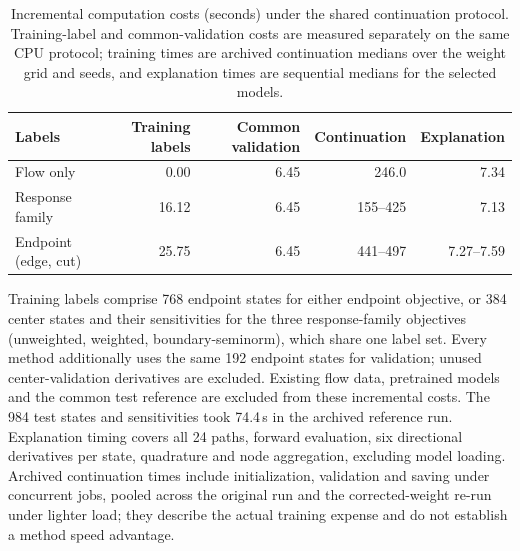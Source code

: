 \begin{table}[t]\centering\footnotesize
\caption{Incremental computation costs (seconds) under the shared
continuation protocol. Training-label and common-validation costs are
measured separately on the same CPU protocol; training times are
archived continuation medians over the weight grid and seeds, and
explanation times are sequential medians for the selected models.}
\label{tab:learning-costs}
\begin{tabular}{lrrrr}\toprule Labels & Training labels & Common validation & Continuation & Explanation\\\midrule
Flow only & 0.00 & 6.45 & 246.0 & 7.34\\
Response family & 16.12 & 6.45 & 155--425 & 7.13\\
Endpoint (edge, cut) & 25.75 & 6.45 & 441--497 & 7.27--7.59\\
\bottomrule\end{tabular}\end{table}
Training labels comprise 768 endpoint states for either endpoint
objective, or 384 center states and their sensitivities for the three
response-family objectives (unweighted, weighted, boundary-seminorm),
which share one label set. Every method additionally uses the same 192
endpoint states for validation; unused center-validation derivatives
are excluded. Existing flow data, pretrained models and the common test
reference are excluded from these incremental costs. The 984 test
states and sensitivities took 74.4\,s in the archived reference run.
Explanation timing covers all 24 paths, forward evaluation, six
directional derivatives per state, quadrature and node aggregation,
excluding model loading. Archived continuation times include
initialization, validation and saving under concurrent jobs, pooled
across the original run and the corrected-weight re-run under lighter
load; they describe the actual training expense and do not establish a
method speed advantage.
